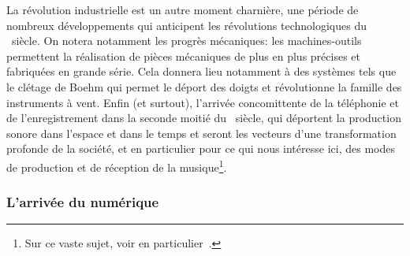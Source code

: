 \indent La révolution industrielle est un autre moment charnière, une période de nombreux développements qui anticipent les révolutions technologiques du ~siècle. On notera notamment les progrès mécaniques: les machines-outils permettent la réalisation de pièces mécaniques de plus en plus précises et fabriquées en grande série. Cela donnera lieu notamment à des systèmes tels que le clétage de Boehm qui permet le déport des doigts et révolutionne la famille des instruments à vent. Enfin (et surtout), l'arrivée concomittente de la téléphonie et de l'enregistrement dans la seconde moitié du ~siècle, qui déportent la production sonore dans l'espace et dans le temps et seront les vecteurs d'une transformation profonde de la société, et en particulier pour ce qui nous intéresse ici, des modes de production et de réception de la musique\footnote{Sur ce vaste sujet, voir en particulier~\cite{theberge_any_1997}.}.


\subsubsection{L'arrivée du numérique}

